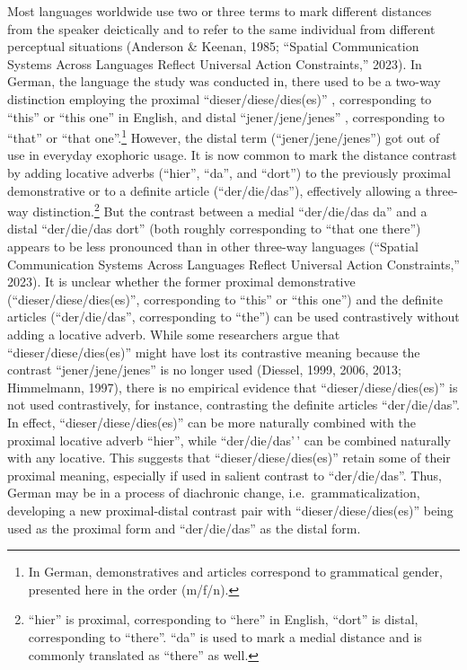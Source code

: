 \documentclass[
  man,floatsintext]{apa6}
\begin{document}
Most languages worldwide use two or three terms to mark different distances from the speaker deictically and to refer to the same individual from different perceptual situations (Anderson \& Keenan, 1985; {``Spatial Communication Systems Across Languages Reflect Universal Action Constraints,''} 2023). In German, the language the study was conducted in, there used to be a two-way distinction employing the proximal ``dieser/diese/dies(es)'' , corresponding to ``this'' or ``this one'' in English, and distal ``jener/jene/jenes'' , corresponding to ``that'' or ``that one''.\footnote{In German, demonstratives and articles correspond to grammatical gender, presented here in the order (m/f/n).} However, the distal term (``jener/jene/jenes'') got out of use in everyday exophoric usage. It is now common to mark the distance contrast by adding locative adverbs (``hier'', ``da'', and ``dort'') to the previously proximal demonstrative or to a definite article (``der/die/das''), effectively allowing a three-way distinction.\footnote{``hier'' is proximal, corresponding to ``here'' in English, ``dort'' is distal, corresponding to ``there''. ``da'' is used to mark a medial distance and is commonly translated as ``there'' as well.} But the contrast between a medial ``der/die/das da'' and a distal ``der/die/das dort'' (both roughly corresponding to ``that one there'') appears to be less pronounced than in other three-way languages ({``Spatial Communication Systems Across Languages Reflect Universal Action Constraints,''} 2023). It is unclear whether the former proximal demonstrative (``dieser/diese/dies(es)'', corresponding to ``this'' or ``this one'') and the definite articles (``der/die/das'', corresponding to ``the'') can be used contrastively without adding a locative adverb. While some researchers argue that ``dieser/diese/dies(es)'' might have lost its contrastive meaning because the contrast ``jener/jene/jenes'' is no longer used (Diessel, 1999, 2006, 2013; Himmelmann, 1997), there is no empirical evidence that ``dieser/diese/dies(es)'' is not used contrastively, for instance, contrasting the definite articles ``der/die/das''. In effect, ``dieser/diese/dies(es)'' can be more naturally combined with the proximal locative adverb ``hier'', while ``der/die/das'\,' can be combined naturally with any locative. This suggests that ``dieser/diese/dies(es)'' retain some of their proximal meaning, especially if used in salient contrast to ``der/die/das''. Thus, German may be in a process of diachronic change, i.e.~grammaticalization, developing a new proximal-distal contrast pair with ``dieser/diese/dies(es)'' being used as the proximal form and ``der/die/das'' as the distal form.
\end{document}
